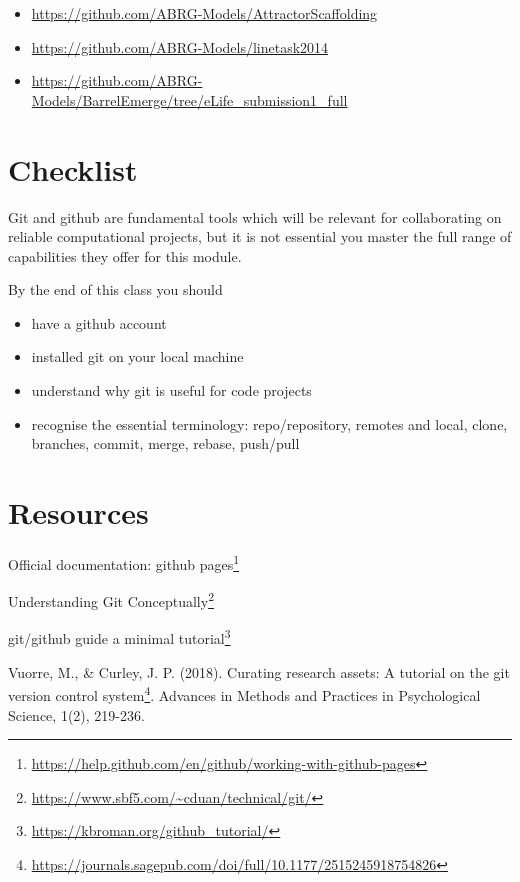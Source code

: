\documentclass[
  12pt,
  a5paper,
]{book}
\DeclareRobustCommand{\href}[2]{#2\footnote{\url{#1}}}
\providecommand{\tightlist}{%
  \setlength{\itemsep}{0pt}\setlength{\parskip}{0pt}}
\begin{document}
\begin{itemize}
\tightlist
\item
  \url{https://github.com/ABRG-Models/AttractorScaffolding}
\item
  \url{https://github.com/ABRG-Models/linetask2014}
\item
  \url{https://github.com/ABRG-Models/BarrelEmerge/tree/eLife_submission1_full}
\end{itemize}

\hypertarget{checklist-7}{%
\section{Checklist}\label{checklist-7}}

Git and github are fundamental tools which will be relevant for collaborating on reliable computational projects, but it is not essential you master the full range of capabilities they offer for this module.

By the end of this class you should

\begin{itemize}
\tightlist
\item
  have a github account
\item
  installed git on your local machine
\item
  understand why git is useful for code projects
\item
  recognise the essential terminology: repo/repository, remotes and local, clone, branches, commit, merge, rebase, push/pull
\end{itemize}

\hypertarget{resources-8}{%
\section{Resources}\label{resources-8}}

Official documentation: \href{https://help.github.com/en/github/working-with-github-pages}{github pages}

\href{https://www.sbf5.com/~cduan/technical/git/}{Understanding Git Conceptually}

\href{https://kbroman.org/github_tutorial/}{git/github guide a minimal tutorial}

Vuorre, M., \& Curley, J. P. (2018). \href{https://journals.sagepub.com/doi/full/10.1177/2515245918754826}{Curating research assets: A tutorial on the git version control system}. Advances in Methods and Practices in Psychological Science, 1(2), 219-236.
\end{document}
